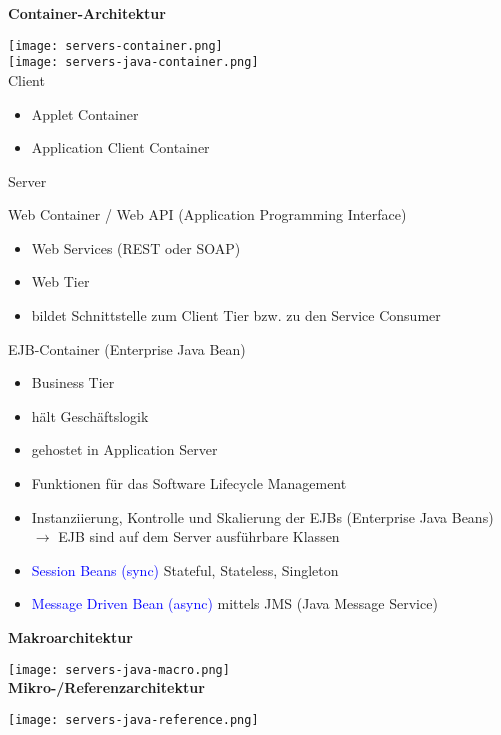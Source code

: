 \textbf{Container-Architektur}

\texttt{[image: servers-container.png]} \\
\texttt{[image: servers-java-container.png]} \\

Client

\begin{itemize}
    \item Applet Container
    \item Application Client Container
\end{itemize}
\vspace{10pt}
Server

Web Container / Web API (Application Programming Interface)

\begin{itemize}
    \item Web Services (REST oder SOAP)
    \item Web Tier
    \item bildet Schnittstelle zum Client Tier bzw. zu den Service Consumer
\end{itemize}
\vspace{10pt}
EJB-Container (Enterprise Java Bean)

\begin{itemize}
    \item Business Tier
    \item hält Geschäftslogik
    \item gehostet in Application Server
    \item Funktionen für das Software Lifecycle Management
    \item Instanziierung, Kontrolle und Skalierung der EJBs (Enterprise Java Beans) $\rightarrow$ EJB sind auf dem Server ausführbare Klassen
    \item \textcolor{blue}{Session Beans (sync)} Stateful, Stateless, Singleton
    \item \textcolor{blue}{Message Driven Bean (async)} mittels JMS (Java Message Service)
\end{itemize}
\vspace{10pt}
\textbf{Makroarchitektur}

\texttt{[image: servers-java-macro.png]} \\

\textbf{Mikro-/Referenzarchitektur}

\texttt{[image: servers-java-reference.png]} \\

